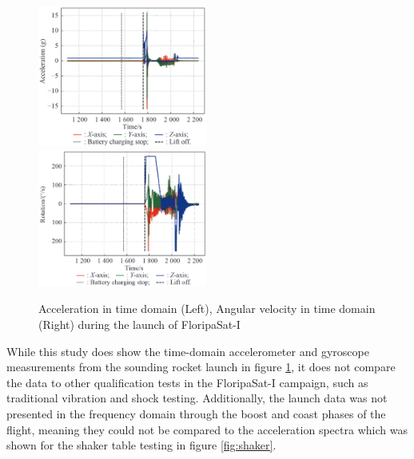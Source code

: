 \documentclass[draft]{report}
\begin{document}
\begin{figure}[H]
  \includegraphics[width=0.495\textwidth]{images/floripa-accel.png}
  \includegraphics[width=0.495\textwidth]{images/floripa-rot.png}
  \caption{Acceleration in time domain (Left), Angular velocity in time domain (Right) during the launch of FloripaSat-I \cite{9316404}}
  \label{fig:accel-rot}
\end{figure}

While this study does show the time-domain accelerometer and gyroscope measurements from the sounding rocket launch in figure \ref{fig:accel-rot}, it does not compare the data to other qualification tests in the FloripaSat-I campaign, such as traditional vibration and shock testing. Additionally, the launch data was not presented in the frequency domain through the boost and coast phases of the flight, meaning they could not be compared to the acceleration spectra which was shown for the shaker table testing in figure \ref{fig:shaker}.
\end{document}
